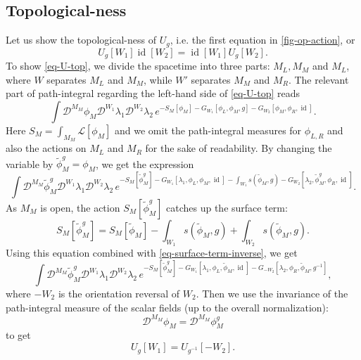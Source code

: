 \documentclass[11pt,toc=bibliography]{scrbook}
\DeclareMathOperator{\id}{id}
\numberwithin{equation}{section}
\begin{document}
\subsection{Topological-ness}
Let us show the topological-ness of $U_g$, i.e. the first equation in \ref{fig-op-action}, or
\begin{equation}
U_{g}[W_1]\id[W_2] = \id[W_1]U_{g}[W_2].
\label{eq-U-top}
\end{equation}
To show \eqref{eq-U-top}, we divide the spacetime into three parts: $M_L,M_M$ and $M_L$, where $W$ separates $M_L$ and $M_M$, while $W'$ separates $M_M$ and $M_R$.
The relevant part of path-integral regarding the left-hand side of \eqref{eq-U-top} reads
\begin{equation}
\int\mathcal{D}^{M_M}\phi_M\mathcal{D}^{W_1}\lambda_1\mathcal{D}^{W_2}\lambda_2 \, e^{-S_M[\phi_M]-G_{W_1}[\phi_L,\phi_M,g]-G_{W_2}[\phi_M,\phi_R,\id]}.
\end{equation}
Here $S_M = \int_{M_M}\mathcal{L}[\phi_M]$ and we omit the path-integral measures for $\phi_{L,R}$ and also the actions on $M_L$ and $M_R$ for the sake of readability.
By changing the variable by $\tilde{\phi}_M^{g} = \phi_M$, we get the expression
\begin{equation}
\int\mathcal{D}^{M_M}\tilde{\phi}_M^g\mathcal{D}^{W_1}\lambda_1\mathcal{D}^{W_2}\lambda_2 \, e^{-S_M[\tilde\phi_M^g]-G_{W_1}[\lambda_1,\phi_L,\phi_M,\id] - \int_{W_1} s(\tilde\phi_M,g) -G_{W_2}[\lambda_2,\tilde\phi_M^g,\phi_R,\id]}.
\end{equation}
As $M_M$ is open, the action $S_M[\tilde\phi_M^g]$ catches up the surface term:
\begin{equation}
S_M[\tilde\phi_M^g] = S_M[\tilde\phi_M] - \int_{W_1} s(\tilde{\phi}_M,g) + \int_{W_2} s(\tilde{\phi}_M,g).
\end{equation}
Using this equation combined with \eqref{eq-surface-term-inverse}, we get
\begin{equation}
\int\mathcal{D}^{M_M}\tilde{\phi}_M^g\mathcal{D}^{W_1}\lambda_1\mathcal{D}^{W_2}\lambda_2 \, e^{-S_M[\tilde\phi_M^g]-G_{W_1}[\lambda_1,\phi_L,\tilde\phi_M,\id] -G_{-W_2}[\lambda_2,\phi_R,\tilde\phi_M,g^{-1}]},
\end{equation}
where $-W_2$ is the orientation reversal of $W_2$.
Then we use the invariance of the path-integral measure of the scalar fields (up to the overall normalization):
\begin{equation}
\mathcal{D}^{M_M}\phi_M = \mathcal{D}^{M_M}\phi_M^g
\label{eq-measure-inv}
\end{equation}
to get
\begin{equation}
U_{g}[W_1]= U_{g^{-1}}[-W_2].
\end{equation}
\end{document}
